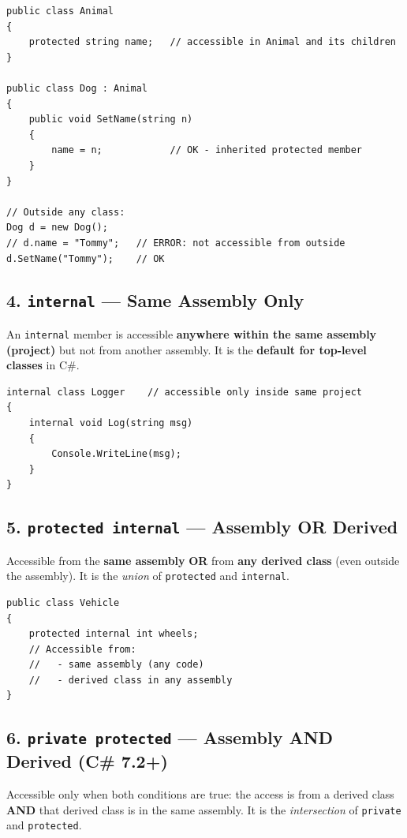 \documentclass[11pt,a4paper]{article}
\begin{document}
\begin{lstlisting}[caption={protected modifier}]
public class Animal
{
    protected string name;   // accessible in Animal and its children
}

public class Dog : Animal
{
    public void SetName(string n)
    {
        name = n;            // OK - inherited protected member
    }
}

// Outside any class:
Dog d = new Dog();
// d.name = "Tommy";   // ERROR: not accessible from outside
d.SetName("Tommy");    // OK
\end{lstlisting}

\subsection{4. \texttt{internal} — Same Assembly Only}

An \texttt{internal} member is accessible \textbf{anywhere within the same assembly (project)} but not from another assembly. It is the \textbf{default for top-level classes} in C\#.

\begin{lstlisting}[caption={internal modifier}]
internal class Logger    // accessible only inside same project
{
    internal void Log(string msg)
    {
        Console.WriteLine(msg);
    }
}
\end{lstlisting}

\subsection{5. \texttt{protected internal} — Assembly OR Derived}

Accessible from the \textbf{same assembly} \textbf{OR} from \textbf{any derived class} (even outside the assembly). It is the \textit{union} of \texttt{protected} and \texttt{internal}.

\begin{lstlisting}[caption={protected internal modifier}]
public class Vehicle
{
    protected internal int wheels;
    // Accessible from:
    //   - same assembly (any code)
    //   - derived class in any assembly
}
\end{lstlisting}

\subsection{6. \texttt{private protected} — Assembly AND Derived (C\# 7.2+)}

Accessible only when both conditions are true: the access is from a derived class \textbf{AND} that derived class is in the same assembly. It is the \textit{intersection} of \texttt{private} and \texttt{protected}.
\end{document}
